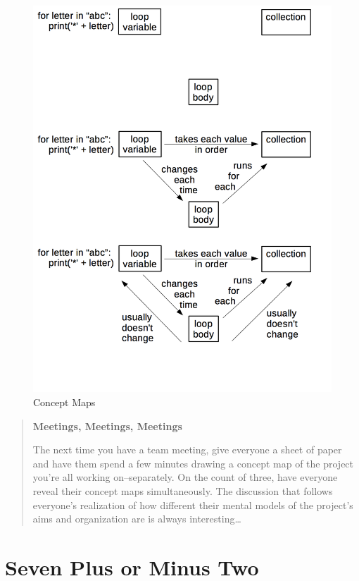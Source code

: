 \documentclass[10pt,statementpaper]{memoir}
\begin{document}
\begin{figure}
\centering
\includegraphics{fig/for-loop-concepts.png}
\caption{Concept Maps}
\end{figure}

\begin{quote}
\textbf{Meetings, Meetings, Meetings}

The next time you have a team meeting, give everyone a sheet of paper
and have them spend a few minutes drawing a concept map of the project
you're all working on--separately. On the count of three, have everyone
reveal their concept maps simultaneously. The discussion that follows
everyone's realization of how different their mental models of the
project's aims and organization are is always interesting\ldots{}
\end{quote}

\section{Seven Plus or Minus Two}\label{seven-plus-or-minus-two}
\end{document}
